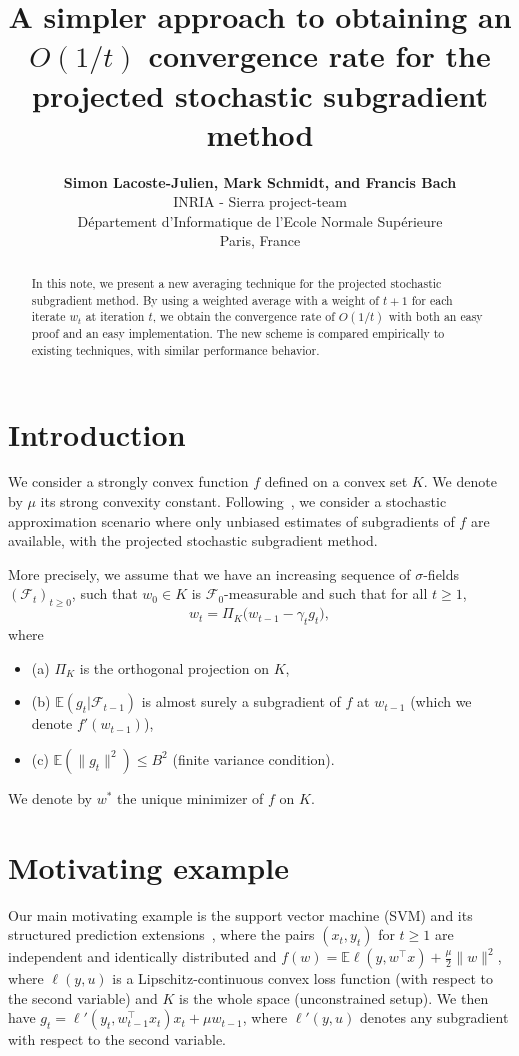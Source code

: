 \documentclass[11pt]{article}
\title{A simpler approach to obtaining an $O(1/t)$ convergence rate for the projected stochastic subgradient method}
\author{ \textbf{Simon Lacoste-Julien, Mark Schmidt, and Francis Bach}\\ 
INRIA - Sierra project-team\\
D\'epartement d'Informatique de l'Ecole Normale Sup\'erieure \\
Paris, France 
}
\newcommand{\BIT}{\begin{itemize}}
\newcommand{\EIT}{\end{itemize}}
\def \E { \mathbb{E} }
\begin{document}
 \maketitle
 
 \begin{abstract}
 In this note, we present a new averaging technique for the projected stochastic subgradient method. By using a weighted average with a weight of $t+1$ for each iterate $w_t$ at iteration $t$, we obtain the convergence rate of $O(1/t)$ with both an easy proof and an easy implementation. The new scheme is compared empirically to existing techniques, with similar performance behavior.
 \end{abstract}
 
 
 \section{Introduction}
 We consider a strongly convex function $f$ defined on a convex set $K$. We denote  by $\mu$ its strong convexity constant. Following~\cite{shalev2007pegasos,nemirovski2009robust,hazan2011beyond,rakhlin2012making}, we consider a stochastic approximation scenario where only unbiased estimates of subgradients of $f$ are available, with the projected stochastic subgradient method.
 
 More precisely, we assume that we have an increasing sequence of $\sigma$-fields $(\mathcal{F}_t)_{t \geqslant 0}$, such that 
 $w_0 \in K$ is $\mathcal{F}_0$-measurable and such that for all $t \geqslant 1$,
 \begin{equation} \label{eq:update}
 w_{t} = \Pi_K \big( w_{t-1} - \gamma_t g_t \big),
 \end{equation}
 where 
 
 \BIT
 \item[(a)]  $\Pi_K$ is the orthogonal projection on $K$, 
 \item[(b)] $ \E ( g_t | \mathcal{F}_{t-1} ) $ is almost surely a subgradient of $f$ at $w_{t-1}$ (which we denote $f'(w_{t-1})$), 
 \item[(c)]  $\E (\| g_t \|^2 ) \leqslant B^2 $ (finite variance condition).
 \EIT
 We denote by $w^\ast$ the unique minimizer of $f$ on $K$. 
 
 \section{Motivating example} \label{sec:example}
 Our main motivating example is the support vector machine (SVM) and its structured prediction extensions~\cite{shalev2010pegasos, tsochantaridis2006large,ratliff2007subgradient}, where the pairs $(x_t,y_t)$ for $t \geqslant 1$ are independent and identically distributed and $f(w) = \E \ell(y,w^\top x) + \frac{\mu}{2} \| w\|^2$, where $\ell(y,u)$ is a Lipschitz-continuous convex loss function (with respect to the second variable) and $K$ is the whole space (unconstrained setup). We then have 
$g_t = \ell'(y_t,w_{t-1}^\top x_t ) x_t + \mu w_{t-1}$, where $\ell'(y,u)$ denotes any subgradient with respect to the second variable.
\end{document}
